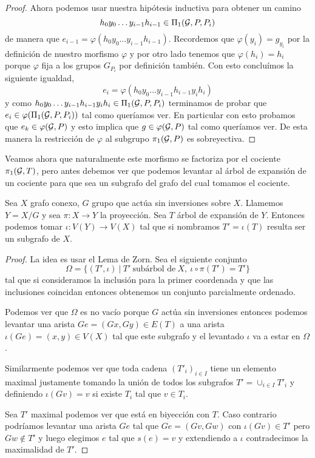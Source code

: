 \documentclass[tesis.tex]{subfiles}
\begin{document}
\begin{proof}
	Ahora podemos usar nuestra hipótesis inductiva para obtener un camino 
	\[
		h_0y_0 \dots y_{i-1}h_{i-1} \in \Pi_1({\cal G}, P, P_i)
	\]
	de manera que $e_{i-1} =  \varphi(h_0y_0 \dots y_{i-1}h_{i-1})$. 
	Recordemos que $\varphi(y_i) = g_{y_i}$ por la definición de nuestro morfismo $\varphi$ y por otro lado tenemos que $\varphi(h_i) = h_i$ porque $\varphi$ fija a los grupos $G_{P_i}$ por definición también.
	Con esto concluímos la siguiente igualdad,
	\[
		e_i = \varphi(h_0y_0 \dots y_{i-1}h_{i-1} y_i h_i)
	\]
	y como $h_0y_0 \dots y_{i-1}h_{i-1} y_i h_i \in \Pi_1({\cal G}, P, P_i)$ terminamos de probar que $e_{i} \in \varphi(\Pi_1({\cal G}, P, P_i))$ tal como queríamos ver. 
	En particular con esto probamos que $e_k \in \varphi({\cal G}, P)$ y esto implica que $g \in \varphi({\cal G}, P)$ tal como queríamos ver.
	De esta manera la restricción de $\varphi$ al subgrupo $\pi_1({\cal G}, P)$ es sobreyectiva.
\end{proof}

Veamos ahora que naturalmente este morfismo se factoriza por el cociente $\pi_1({\cal G}, T)$, pero antes debemos ver que podemos levantar al árbol de expansión de un cociente para que sea un subgrafo del grafo del cual tomamos el cociente.

\begin{prop}
	Sea $X$ grafo conexo, $G$ grupo que actúa sin inversiones sobre $X$.
	Llamemos $Y= X / G$ y sea $\pi:X \to Y$ la proyección. 
	Sea $T$ árbol de expansión de $Y$.
	Entonces podemos tomar $\iota:V(Y) \to V(X)$ tal que si nombramos $T' = \iota(T)$ resulta ser un subgrafo de $X$.
\end{prop}

\begin{proof}
	La idea es usar el Lema de Zorn.
	Sea el siguiente conjunto
	\[
		\Omega = \{ (T', \iota)	  \ | \   T' \ \text{subárbol de} \ X, \ \iota \circ \pi(T') = T' \}
	\]
	tal que si consideramos la inclusión para la primer coordenada y que las inclusiones coincidan entonces obtenemos un conjunto parcialmente ordenado.
	
	Podemos ver que $\Omega$ es no vacío porque $G$ actúa sin inversiones entonces podemos levantar una arista $Ge = (Gx,Gy) \in E(T)$ a una arista $\iota (Ge) = (x,y) \in V(X)$ tal que este subgrafo y el levantado $\iota$ va a estar en $\Omega$.
	
	Similarmente podemos ver que toda cadena $(T'_i)_{i \in I}$ tiene un elemento maximal justamente tomando la unión de todos los subgrafos $T' = \cup_{i \in I} T'_{i}$ y definiendo $\iota(Gv) = v$ si existe $T_{i}$ tal que $v \in T_{i}$.
	
	Sea $T'$ maximal podemos ver que está en biyección con $T$.
	Caso contrario podríamos levantar una arista $Ge$ tal que $Ge=(Gv,Gw)$ con $\iota(Gv) \in T'$ pero $Gw \notin T'$ y luego elegimos $e$ tal que $s(e) = v$ y extendiendo a $\iota$ contradecimos la maximalidad de $T'$.	
\end{proof}
\end{document}
